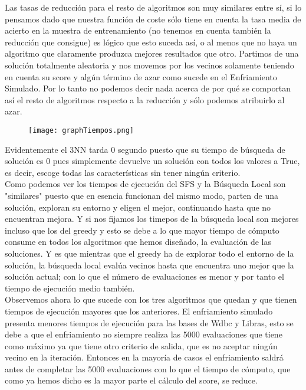 \documentclass[10pt,a4paper]{article}
\begin{document}
Las tasas de reducción para el resto de algoritmos son muy similares entre sí, si lo pensamos dado que nuestra función de coste sólo tiene en cuenta la tasa media de acierto en la muestra de entrenamiento (no tenemos en cuenta también la reducción que consigue) es lógico que esto suceda así, o al menos que no haya un algoritmo que claramente produzca mejores resultados que otro. Partimos de una solución totalmente aleatoria y nos movemos por los vecinos solamente teniendo en cuenta su score y algún término de azar como sucede en el Enfriamiento Simulado. Por lo tanto no podemos decir nada acerca de por qué se comportan así el resto de algoritmos respecto a la reducción y sólo podemos atribuirlo al azar.\\


\begin{figure}[H]
\centering
\texttt{[image: graphTiempos.png]}
\end{figure}


Evidentemente el 3NN tarda 0 segundo puesto que su tiempo de búsqueda de solución es 0 pues simplemente devuelve un solución con todos los valores a True, es decir, escoge todas las características sin tener ningún criterio.\\

Como podemos ver los tiempos de ejecución del SFS y la Búsqueda Local son "similares" puesto que en esencia funcionan del mismo modo, parten de una solución, exploran su entorno y eligen el mejor, continuando hasta que no encuentran mejora. Y si nos fijamos los timepos de la búsqueda local son mejores incluso que los del greedy y esto se debe a lo que mayor tiempo de cómputo consume en todos los algoritmos que hemos diseñado, la evaluación de las soluciones. Y es que mientras que el greedy ha de explorar todo el entorno de la solución, la búsqueda local evalúa vecinos hasta que encuentra uno mejor que la solución actual; con lo que el número de evaluaciones es menor y por tanto el tiempo de ejecución medio también.\\

Observemos ahora lo que sucede con los tres algoritmos que quedan y que tienen tiempos de ejecución mayores que los anteriores. El enfriamiento simulado presenta menores tiempos de ejecución para las bases de Wdbc y Libras, esto se debe a que el enfriamiento no siempre realiza las 5000 evaluaciones que tiene como máximo ya que tiene otro criterio de salida, que es no aceptar ningún vecino en la iteración. Entonces en la mayoría de casos el enfriamiento saldrá antes de completar las 5000 evaluaciones con lo que el tiempo de cómputo, que como ya hemos dicho es la mayor parte el cálculo del score, se reduce.\\
\end{document}
